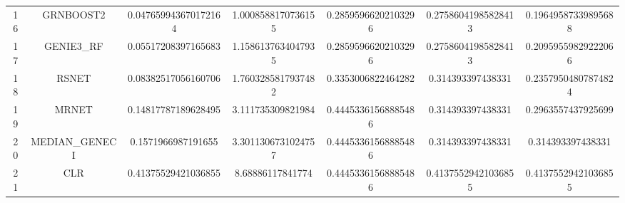 \documentclass[a4paper,10pt]{article}
\begin{document}
\begin{landscape}
\begin{table}[!htp]
\begin{tabular}{ccccccc}
16&GRNBOOST2&0.047659943670172164&1.0008588170736155&0.28595966202103296&0.27586041985828413&0.19649587339895688\\
17&GENIE3_RF&0.05517208397165683&1.1586137634047935&0.28595966202103296&0.27586041985828413&0.20959559829222066\\
18&RSNET&0.08382517056160706&1.7603285817937482&0.3353006822464282&0.314393397438331&0.23579504807874824\\
19&MRNET&0.14817787189628495&3.111735309821984&0.44453361568885486&0.314393397438331&0.2963557437925699\\
20&MEDIAN_GENECI&0.1571966987191655&3.3011306731024757&0.44453361568885486&0.314393397438331&0.314393397438331\\
21&CLR&0.41375529421036855&8.68886117841774&0.44453361568885486&0.41375529421036855&0.41375529421036855\\
\hline
\end{tabular}
\end{table}


\end{landscape}
\end{document}
